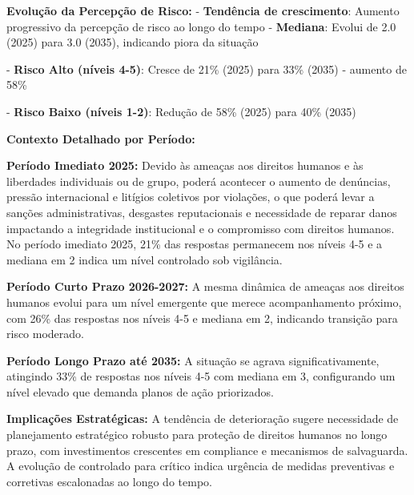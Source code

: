 \documentclass[
  portuguese,
  letterpaper,
  DIV=11,
  numbers=noendperiod]{scrreprt}
\begin{document}
\begin{tcolorbox}[enhanced jigsaw, breakable, leftrule=.75mm, opacitybacktitle=0.6, coltitle=black, rightrule=.15mm, colbacktitle=quarto-callout-note-color!10!white, colframe=quarto-callout-note-color-frame, titlerule=0mm, bottomtitle=1mm, colback=white, toprule=.15mm, toptitle=1mm, left=2mm, title=\textcolor{quarto-callout-note-color}{\faInfo}\hspace{0.5em}{Destaque}, opacityback=0, bottomrule=.15mm, arc=.35mm]

\textbf{Evolução da Percepção de Risco:} - \textbf{Tendência de
crescimento}: Aumento progressivo da percepção de risco ao longo do
tempo - \textbf{Mediana}: Evolui de 2.0 (2025) para 3.0 (2035),
indicando piora da situação

- \textbf{Risco Alto (níveis 4-5)}: Cresce de 21\% (2025) para 33\%
(2035) - aumento de 58\%

- \textbf{Risco Baixo (níveis 1-2)}: Redução de 58\% (2025) para 40\%
(2035)

\textbf{Contexto Detalhado por Período:}

\textbf{Período Imediato 2025:} Devido às ameaças aos direitos humanos e
às liberdades individuais ou de grupo, poderá acontecer o aumento de
denúncias, pressão internacional e litígios coletivos por violações, o
que poderá levar a sanções administrativas, desgastes reputacionais e
necessidade de reparar danos impactando a integridade institucional e o
compromisso com direitos humanos. No período imediato 2025, 21\% das
respostas permanecem nos níveis 4-5 e a mediana em 2 indica um nível
controlado sob vigilância.

\textbf{Período Curto Prazo 2026-2027:} A mesma dinâmica de ameaças aos
direitos humanos evolui para um nível emergente que merece
acompanhamento próximo, com 26\% das respostas nos níveis 4-5 e mediana
em 2, indicando transição para risco moderado.

\textbf{Período Longo Prazo até 2035:} A situação se agrava
significativamente, atingindo 33\% de respostas nos níveis 4-5 com
mediana em 3, configurando um nível elevado que demanda planos de ação
priorizados.

\textbf{Implicações Estratégicas:} A tendência de deterioração sugere
necessidade de planejamento estratégico robusto para proteção de
direitos humanos no longo prazo, com investimentos crescentes em
compliance e mecanismos de salvaguarda. A evolução de controlado para
crítico indica urgência de medidas preventivas e corretivas escalonadas
ao longo do tempo.

\end{tcolorbox}
\end{document}
